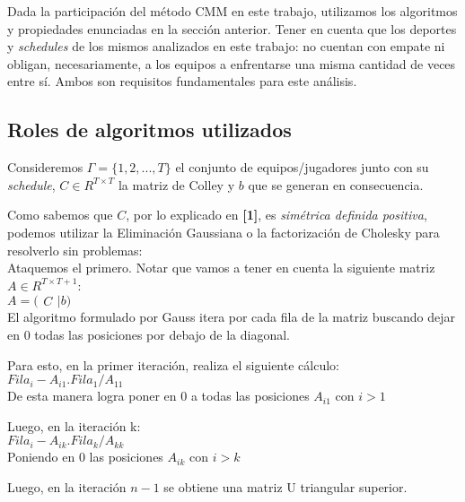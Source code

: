 Dada la participaci\'on del m\'etodo CMM en este trabajo, utilizamos los algoritmos y propiedades enunciadas en la secci\'on anterior. Tener en cuenta que los deportes y \textit{schedules} de los mismos analizados en este trabajo: no cuentan con empate ni obligan, necesariamente, a los equipos a enfrentarse una misma cantidad de veces entre s\'i. Ambos son requisitos fundamentales para este an\'alisis.

\subsection{Roles de algoritmos utilizados}

Consideremos $\Gamma = \{1,2,...,T\}$ el conjunto de equipos/jugadores junto con su \textit{schedule}, $C \in R^{T \times T}$ la matriz de Colley y $b$ que se generan en consecuencia.

Como sabemos que $C$, por lo explicado en \textbf{[1]}, es \textit{sim\'etrica definida positiva}, podemos utilizar la Eliminaci\'on Gaussiana o la factorizaci\'on de Cholesky para resolverlo sin problemas: \\

Ataquemos el primero. Notar que vamos a tener en cuenta la siguiente matriz $A \in R^{T \times T+1}$: \\

$A = \Big(
\begin{matrix}
C
\end{matrix}
\vert
b
\Big)$ \\

El algoritmo formulado por Gauss itera por cada fila de la matriz buscando dejar en 0 todas las posiciones por debajo de la diagonal.

Para esto, en la primer iteraci\'on, realiza el siguiente c\'alculo: \\

$Fila_{i} - A_{i1} . Fila_{1} / A_{11}$ \\

De esta manera logra poner en $0$ a todas las posiciones $A_{i1}$ con $i > 1$

Luego, en la iteraci\'on k: \\

$Fila_{i} - A_{ik} . Fila_{k} / A_{kk}$ \\

Poniendo en $0$ las posiciones $A_{ik}$ con $i > k$

Luego, en la iteraci\'on $n-1$ se obtiene una matriz U triangular superior.

